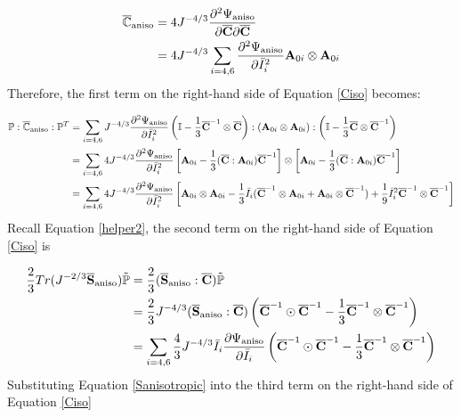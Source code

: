 \begin{equation}
\begin{split}
\overline{\mathbb{C}}_\mathrm{aniso} 
&= 4J^{-4/3}\frac{\partial^2\Psi_\mathrm{aniso}}{\partial\overline{\bold{C}}\partial\overline{\bold{C}}} \\
&= 4J^{-4/3}\sum_{i = 4, 6}\frac{\partial^2\Psi_\mathrm{aniso}}{\partial{\bar{I}_i}^2}\bold{A}_{0i} \otimes \bold{A}_{0i}
\end{split}
\end{equation}
Therefore, the first term on the right-hand side of Equation \ref{Ciso} becomes:

\begin{equation} \label{part13}
\begin{split}
\mathbb{P} : \overline{\mathbb{C}}_\mathrm{aniso} : \mathbb{P}^T 
&= \sum_{i = 4, 6}J^{-4/3}\frac{\partial^2\Psi_\mathrm{aniso}}{\partial{\bar{I}_i}^2} \left( \mathbb{I} - \frac{1}{3}\overline{\bold{C}}^{-1} \otimes \overline{\bold{C}} \right):(\bold{A}_{0i} \otimes \bold{A}_{0i}):\left( \mathbb{I} - \frac{1}{3}\overline{\bold{C}} \otimes \overline{\bold{C}}^{-1} \right) \\
&= \sum_{i = 4, 6} 4J^{-4/3}\frac{\partial^2\Psi_\mathrm{aniso}}{\partial{\bar{I}_i}^2}
\left[ \bold{A}_{0i} - \frac{1}{3}(\overline{\bold{C}} : \bold{A}_{0i})\overline{\bold{C}}^{-1} \right] \otimes
\left[ \bold{A}_{0i} - \frac{1}{3}(\overline{\bold{C}} : \bold{A}_{0i})\overline{\bold{C}}^{-1} \right] \\
&= \sum_{i = 4, 6} 4J^{-4/3}\frac{\partial^2\Psi_\mathrm{aniso}}{\partial{\bar{I}_i}^2}
\left[ \bold{A}_{0i} \otimes \bold{A}_{0i} - \frac{1}{3}\bar{I}_i
(\overline{\bold{C}}^{-1} \otimes \bold{A}_{0i} + \bold{A}_{0i} \otimes \overline{\bold{C}}^{-1}) 
+ \frac{1}{9}\bar{I}_i^2 \overline{\bold{C}}^{-1} \otimes \overline{\bold{C}}^{-1} \right]
\end{split}
\end{equation}
Recall Equation \ref{helper2}, the second term on the right-hand side of Equation \ref{Ciso} is

\begin{equation} \label{part23}
\begin{split}
\frac{2}{3}Tr(J^{-2/3}\overline{\bold{S}}_\mathrm{aniso})\tilde{\mathbb{P}} &= \frac{2}{3}(\overline{\bold{S}}_\mathrm{aniso} : \overline{\bold{C}}) \tilde{\mathbb{P}} \\
&= \frac{2}{3}J^{-4/3}(\overline{\bold{S}}_\mathrm{aniso} : \overline{\bold{C}}) 
\left( \overline{\bold{C}}^{-1} \odot \overline{\bold{C}}^{-1} - \frac{1}{3}\overline{\bold{C}}^{-1}\otimes\overline{\bold{C}}^{-1} \right) \\
&= \sum_{i = 4, 6}\frac{4}{3}J^{-4/3}\bar{I}_i\frac{\partial{\Psi_\mathrm{aniso}}}{\partial\bar{I}_i}
\left( \overline{\bold{C}}^{-1} \odot \overline{\bold{C}}^{-1} - \frac{1}{3}\overline{\bold{C}}^{-1}\otimes\overline{\bold{C}}^{-1} \right) \\
\end{split}
\end{equation}
Substituting Equation \ref{Sanisotropic} into the third term on the right-hand side of Equation \ref{Ciso}

